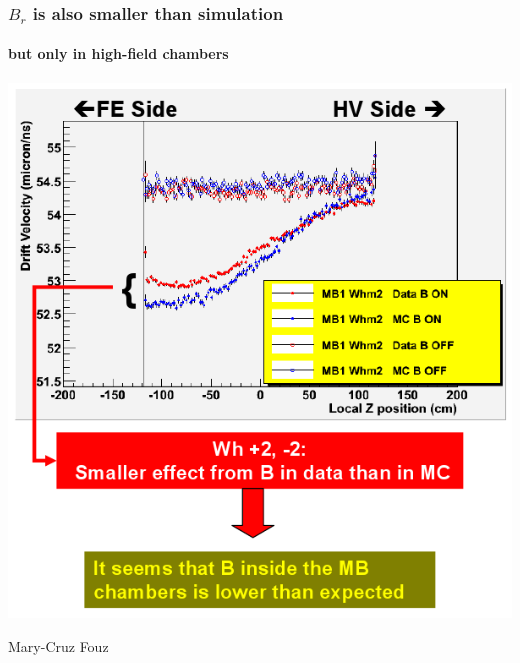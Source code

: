 \documentclass[compress]{beamer}
\begin{document}
\begin{frame}
\frametitle{$B_r$ is also smaller than simulation}
\framesubtitle{but only in high-field chambers}

\vspace{-0.25 cm}
\begin{center}
\includegraphics[width=0.7\linewidth]{cruz_analysis.png}
\end{center}

\vspace{-0.75 cm}
\hfill {\tiny Mary-Cruz Fouz}
\label{numpages}
\end{frame}




\end{document}
